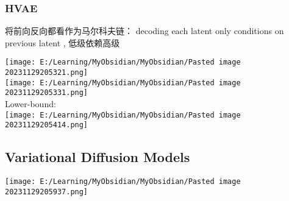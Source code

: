 \documentclass[
]{article}
\begin{document}
\subsubsection{HVAE}\label{hvae}

将前向反向都看作为马尔科夫链： decoding each latent {} only conditions
on previous latent {}, 低级依赖高级

\texttt{[image: E:/Learning/MyObsidian/MyObsidian/Pasted image 20231129205321.png]}\\
\texttt{[image: E:/Learning/MyObsidian/MyObsidian/Pasted image 20231129205331.png]}\\
Lower-bound:\\
\texttt{[image: E:/Learning/MyObsidian/MyObsidian/Pasted image 20231129205414.png]}

\subsection{Variational Diffusion
Models}\label{variational-diffusion-models}

\texttt{[image: E:/Learning/MyObsidian/MyObsidian/Pasted image 20231129205937.png]}
\end{document}
